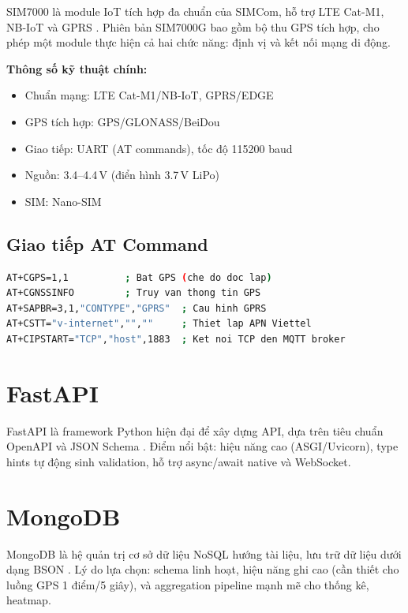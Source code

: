 \documentclass[13pt, a4paper]{report}
\begin{document}
SIM7000 là module IoT tích hợp đa chuẩn của SIMCom, hỗ trợ LTE Cat-M1, NB-IoT và GPRS \cite{simcom2023sim7000}. Phiên bản SIM7000G bao gồm bộ thu GPS tích hợp, cho phép một module thực hiện cả hai chức năng: định vị và kết nối mạng di động.

\textbf{Thông số kỹ thuật chính:}
\begin{itemize}[noitemsep]
  \item Chuẩn mạng: LTE Cat-M1/NB-IoT, GPRS/EDGE
  \item GPS tích hợp: GPS/GLONASS/BeiDou
  \item Giao tiếp: UART (AT commands), tốc độ 115200 baud
  \item Nguồn: 3.4--4.4\,V (điển hình 3.7\,V LiPo)
  \item SIM: Nano-SIM
\end{itemize}

\subsection{Giao tiếp AT Command}

\begin{lstlisting}[language=bash, caption=Các lệnh AT cơ bản cho SIM7000]
AT+CGPS=1,1          ; Bat GPS (che do doc lap)
AT+CGNSSINFO         ; Truy van thong tin GPS
AT+SAPBR=3,1,"CONTYPE","GPRS"  ; Cau hinh GPRS
AT+CSTT="v-internet","",""     ; Thiet lap APN Viettel
AT+CIPSTART="TCP","host",1883  ; Ket noi TCP den MQTT broker
\end{lstlisting}

\section{FastAPI}

FastAPI là framework Python hiện đại để xây dựng API, dựa trên tiêu chuẩn OpenAPI và JSON Schema \cite{ramirez2021fastapi}. Điểm nổi bật: hiệu năng cao (ASGI/Uvicorn), type hints tự động sinh validation, hỗ trợ async/await native và WebSocket.

\section{MongoDB}

MongoDB là hệ quản trị cơ sở dữ liệu NoSQL hướng tài liệu, lưu trữ dữ liệu dưới dạng BSON \cite{banker2011mongodb}. Lý do lựa chọn: schema linh hoạt, hiệu năng ghi cao (cần thiết cho luồng GPS 1 điểm/5 giây), và aggregation pipeline mạnh mẽ cho thống kê, heatmap.
\end{document}
